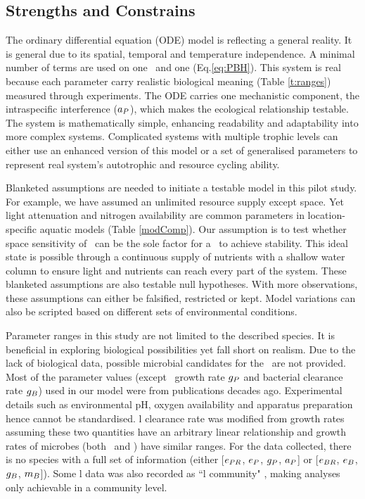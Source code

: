 \documentclass[../thesis.tex]{subfiles} %
\begin{document}
\subsection{Strengths and Constrains}
The ordinary differential equation (ODE) model is reflecting a general reality.  It is general due to its spatial, temporal and temperature independence.  A minimal number of terms are used on one \phy\ and one \bac (Eq.\ref{eq:PBH}).  This system is real because each parameter carry realistic biological meaning (Table \ref{t:ranges}) measured through experiments.  The ODE carries one mechanistic component, the intraspecific interference ($a_P$), which makes the ecological relationship testable.  The system is mathematically simple, enhancing readability and adaptability into more complex systems.  Complicated systems with multiple trophic levels can either use an enhanced version of this model or a set of generalised parameters to represent real system's autotrophic and resource cycling ability.

Blanketed assumptions are needed to initiate a testable model in this pilot study.  For example, we have assumed an unlimited resource supply except space.  Yet light attenuation and nitrogen availability are common parameters in location-specific aquatic models (Table \ref{modComp}).  Our assumption is to test whether space sensitivity of \phy\ can be the sole factor for a \pbs\ to achieve stability.  This ideal state is possible through a continuous supply of nutrients with a shallow water column to ensure light and nutrients can reach every part of the system.  These blanketed assumptions are also testable null hypotheses.  With more observations, these assumptions can either be falsified, restricted or kept.  Model variations can also be scripted based on different sets of environmental conditions.

Parameter ranges in this study are not limited to the described species.  It is beneficial in exploring biological possibilities yet fall short on realism.  Due to the lack of biological data, possible microbial candidates for the \pbs\ are not provided.  Most of the parameter values (except \phy\ growth rate $g_P$ and bacterial clearance rate $g_B$) used in our model were from publications decades ago.  Experimental details such as environmental pH, oxygen availability and apparatus preparation hence cannot be standardised.  \Bac l clearance rate was modified from growth rates assuming these two quantities have an arbitrary linear relationship and growth rates of microbes (both \phy\ and \bac) have similar ranges.  For the data collected, there is no species with a full set of information (either [$e_{PR}$, $e_P$, $g_P$, $a_P$] or [$e_{BR}$, $e_B$, $g_B$, $m_B$]).  Some \bac l data was also recorded as ``\bac l community" \autocite{cochran1988estimation}, making analyses only achievable in a community level.
\end{document}
